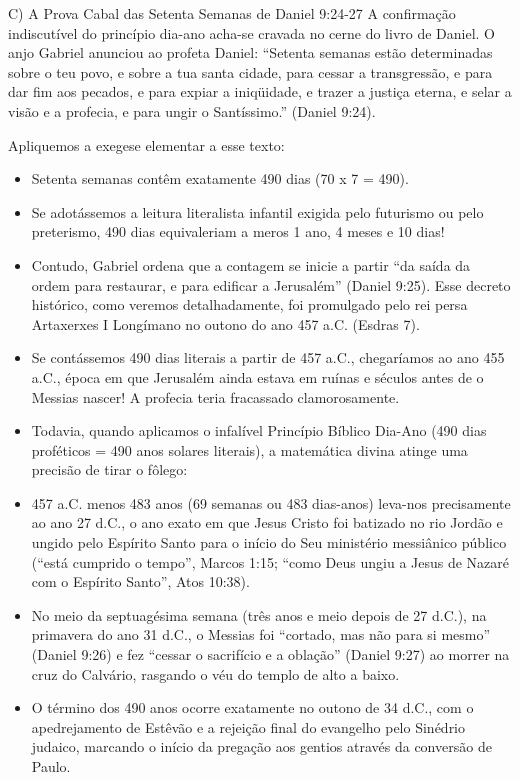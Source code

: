 \documentclass[11pt,a4paper,openany]{book}
\begin{document}
C) A Prova Cabal das Setenta Semanas de Daniel 9:24-27
A confirmação indiscutível do princípio dia-ano acha-se cravada no cerne do livro de Daniel. O anjo Gabriel anunciou ao profeta Daniel:
``Setenta semanas estão determinadas sobre o teu povo, e sobre a tua santa cidade, para cessar a transgressão, e para dar fim aos pecados, e para expiar a iniqüidade, e trazer a justiça eterna, e selar a visão e a profecia, e para ungir o Santíssimo.'' (Daniel 9:24).

Apliquemos a exegese elementar a esse texto:
\begin{itemize}
  \item Setenta semanas contêm exatamente 490 dias (70 x 7 = 490).
  \item Se adotássemos a leitura literalista infantil exigida pelo futurismo ou pelo preterismo, 490 dias equivaleriam a meros 1 ano, 4 meses e 10 dias!
  \item Contudo, Gabriel ordena que a contagem se inicie a partir ``da saída da ordem para restaurar, e para edificar a Jerusalém'' (Daniel 9:25). Esse decreto histórico, como veremos detalhadamente, foi promulgado pelo rei persa Artaxerxes I Longímano no outono do ano 457 a.C. (Esdras 7).
  \item Se contássemos 490 dias literais a partir de 457 a.C., chegaríamos ao ano 455 a.C., época em que Jerusalém ainda estava em ruínas e séculos antes de o Messias nascer! A profecia teria fracassado clamorosamente.
  \item Todavia, quando aplicamos o infalível Princípio Bíblico Dia-Ano (490 dias proféticos = 490 anos solares literais), a matemática divina atinge uma precisão de tirar o fôlego:
  \item 457 a.C. menos 483 anos (69 semanas ou 483 dias-anos) leva-nos precisamente ao ano 27 d.C., o ano exato em que Jesus Cristo foi batizado no rio Jordão e ungido pelo Espírito Santo para o início do Seu ministério messiânico público (``está cumprido o tempo'', Marcos 1:15; ``como Deus ungiu a Jesus de Nazaré com o Espírito Santo'', Atos 10:38).
  \item No meio da septuagésima semana (três anos e meio depois de 27 d.C.), na primavera do ano 31 d.C., o Messias foi ``cortado, mas não para si mesmo'' (Daniel 9:26) e fez ``cessar o sacrifício e a oblação'' (Daniel 9:27) ao morrer na cruz do Calvário, rasgando o véu do templo de alto a baixo.
  \item O término dos 490 anos ocorre exatamente no outono de 34 d.C., com o apedrejamento de Estêvão e a rejeição final do evangelho pelo Sinédrio judaico, marcando o início da pregação aos gentios através da conversão de Paulo.
\end{itemize}
\end{document}
